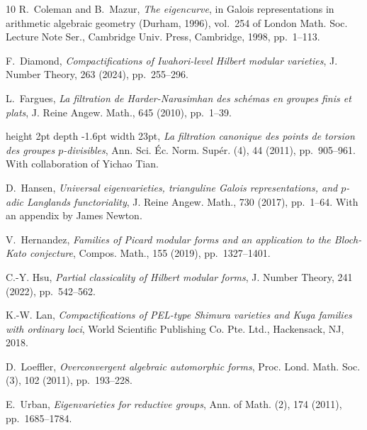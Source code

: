 \documentclass[11pt]{amsart}
\theoremstyle{definition} %
\theoremstyle{plain} %
\theoremstyle{remark} %
\begin{document}
\begin{thebibliography}{10}
{\sc R.~Coleman and B.~Mazur}, {\em The eigencurve}, in Galois representations
  in arithmetic algebraic geometry ({D}urham, 1996), vol.~254 of London Math.
  Soc. Lecture Note Ser., Cambridge Univ. Press, Cambridge, 1998, pp.~1--113.

{\sc F.~Diamond}, {\em Compactifications of {I}wahori-level {H}ilbert modular
  varieties}, J.
  Number Theory, 263 (2024), pp.~255--296.



{\sc L.~Fargues}, {\em La filtration de {H}arder-{N}arasimhan des sch\'{e}mas
  en groupes finis et plats}, J. Reine Angew. Math., 645 (2010), pp.~1--39.

\leavevmode\vrule height 2pt depth -1.6pt width 23pt, {\em La filtration
  canonique des points de torsion des groupes {$p$}-divisibles}, Ann. Sci.
  \'{E}c. Norm. Sup\'{e}r. (4), 44 (2011), pp.~905--961.
\newblock With collaboration of Yichao Tian.

{\sc D.~Hansen}, {\em Universal eigenvarieties, trianguline {G}alois
  representations, and {$p$}-adic {L}anglands functoriality}, J. Reine Angew.
  Math., 730 (2017), pp.~1--64.
\newblock With an appendix by James Newton.

{\sc V.~Hernandez}, {\em Families of {P}icard modular forms and an application
  to the {B}loch-{K}ato conjecture}, Compos. Math., 155 (2019), pp.~1327--1401.

{\sc C.-Y. Hsu}, {\em Partial classicality of {H}ilbert modular forms}, J.
  Number Theory, 241 (2022), pp.~542--562.

{\sc K.-W. Lan}, {\em Compactifications of {PEL}-type {S}himura varieties and
  {K}uga families with ordinary loci}, World Scientific Publishing Co. Pte.
  Ltd., Hackensack, NJ, 2018.

{\sc D.~Loeffler}, {\em Overconvergent algebraic automorphic forms}, Proc.
  Lond. Math. Soc. (3), 102 (2011), pp.~193--228.

{\sc E.~Urban}, {\em Eigenvarieties for reductive groups}, Ann. of Math. (2),
  174 (2011), pp.~1685--1784.

\end{thebibliography}
\end{document}
